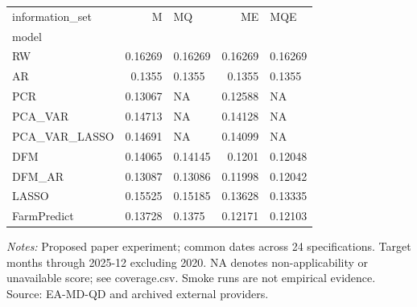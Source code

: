 \begin{threeparttable}
\begin{tabular}{lrlrl}
\toprule
information\_set & M & MQ & ME & MQE \\
model &  &  &  &  \\
\midrule
RW & 0.16269 & 0.16269 & 0.16269 & 0.16269 \\
AR & 0.1355 & 0.1355 & 0.1355 & 0.1355 \\
PCR & 0.13067 & NA & 0.12588 & NA \\
PCA\_VAR & 0.14713 & NA & 0.14128 & NA \\
PCA\_VAR\_LASSO & 0.14691 & NA & 0.14099 & NA \\
DFM & 0.14065 & 0.14145 & 0.1201 & 0.12048 \\
DFM\_AR & 0.13087 & 0.13086 & 0.11998 & 0.12042 \\
LASSO & 0.15525 & 0.15185 & 0.13628 & 0.13335 \\
FarmPredict & 0.13728 & 0.1375 & 0.12171 & 0.12103 \\
\bottomrule
\end{tabular}
\begin{tablenotes}[flushleft]\footnotesize
\item \textit{Notes:} Proposed paper experiment; common dates across 24 specifications. Target months through 2025-12 excluding 2020. NA denotes non-applicability or unavailable score; see coverage.csv. Smoke runs are not empirical evidence. Source: EA-MD-QD and archived external providers.
\end{tablenotes}
\end{threeparttable}
